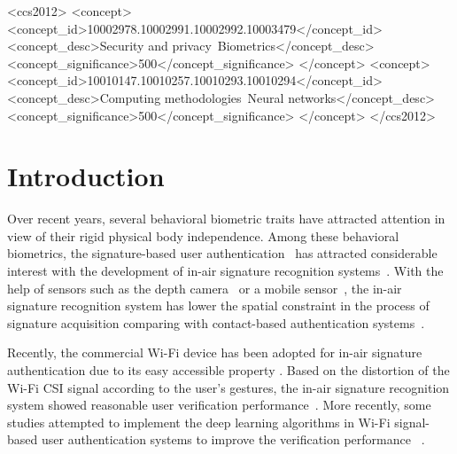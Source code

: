 \documentclass{sig-alternate-05-2015}
\begin{document}
%
%
\begin{CCSXML}
       <ccs2012>
       <concept>
       <concept_id>10002978.10002991.10002992.10003479</concept_id>
       <concept_desc>Security and privacy~Biometrics</concept_desc>
       <concept_significance>500</concept_significance>
       </concept>
       <concept>   
       <concept_id>10010147.10010257.10010293.10010294</concept_id>
       <concept_desc>Computing methodologies~Neural networks</concept_desc>
       <concept_significance>500</concept_significance>
       </concept>
       </ccs2012>
\end{CCSXML}
       
%
%

%
%
\printccsdesc



\section{Introduction}
Over recent years, several behavioral biometric traits have attracted attention in view of their rigid physical body independence. Among these behavioral biometrics, the signature-based user authentication~\cite{fahmy2010online,sanmorino2012survey,galbally2015line} has attracted considerable interest with the development of in-air signature recognition systems~\cite{jeon2012system,malik20183dairsig,ketabdar2012magnetic,moon2017air}.
With the help of sensors such as the depth camera~\cite{jeon2012system,malik20183dairsig} or a mobile sensor~\cite{ketabdar2012magnetic}, the in-air signature recognition system has lower the spatial constraint in the process of signature acquisition comparing with contact-based authentication systems~\cite{zhu2000biometric,jain2002line,sesa2012information}.

Recently, the commercial Wi-Fi device has been adopted for in-air signature authentication due to its easy accessible property \cite{moon2017air}. Based on the distortion of the  Wi-Fi CSI signal according to the user's gestures, the in-air signature recognition system showed reasonable user verification performance~\cite{moon2017air}. More recently, some studies attempted to implement the deep learning algorithms in Wi-Fi signal-based user authentication systems to improve the verification performance ~\cite{shi2017smart,pokkunuru2018neuralwave}. 
\end{document}

